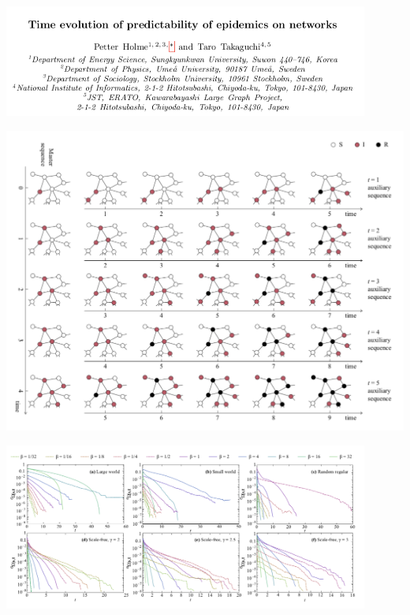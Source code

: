 \documentclass[aspectratio=169]{beamer}
\begin{document}
\begin{frame}

\begin{center}
\includegraphics[width = 0.9\textwidth]{figures/holme_time_2015_title}
\end{center}

\end{frame}
\begin{frame}

\begin{center}
\includegraphics[height = 0.9\textheight]{figures/holme_time_2015_fig1}
\end{center}

\end{frame}
\begin{frame}

\begin{center}
\includegraphics[width = 0.9\textwidth]{figures/holme_time_2015_fig3}
\end{center}

\end{frame}
\end{document}
